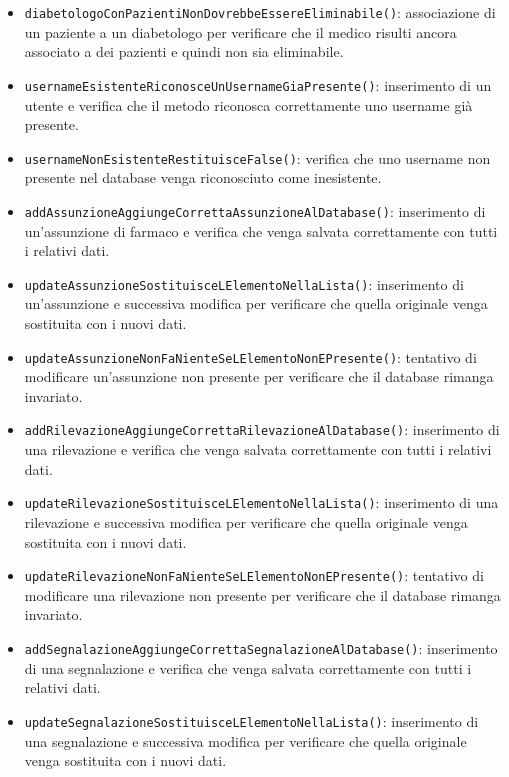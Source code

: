 \begin{itemize}
	\item \texttt{diabetologoConPazientiNonDovrebbeEssereEliminabile()}: associazione di un paziente a un diabetologo per verificare che il medico risulti ancora associato a dei pazienti e quindi non sia eliminabile.
	
	\item \texttt{usernameEsistenteRiconosceUnUsernameGiaPresente()}: inserimento di un utente e verifica che il metodo riconosca correttamente uno username già presente.
	
	\item \texttt{usernameNonEsistenteRestituisceFalse()}: verifica che uno username non presente nel database venga riconosciuto come inesistente.
	
	\item \texttt{addAssunzioneAggiungeCorrettaAssunzioneAlDatabase()}: inserimento di un'assunzione di farmaco e verifica che venga salvata correttamente con tutti i relativi dati.
	
	\item \texttt{updateAssunzioneSostituisceLElementoNellaLista()}: inserimento di un'assunzione e successiva modifica per verificare che quella originale venga sostituita con i nuovi dati.
	
	\item \texttt{updateAssunzioneNonFaNienteSeLElementoNonEPresente()}: tentativo di modificare un'assunzione non presente per verificare che il database rimanga invariato.
	
	\item \texttt{addRilevazioneAggiungeCorrettaRilevazioneAlDatabase()}: inserimento di una rilevazione e verifica che venga salvata correttamente con tutti i relativi dati.
	
	\item \texttt{updateRilevazioneSostituisceLElementoNellaLista()}: inserimento di una rilevazione e successiva modifica per verificare che quella originale venga sostituita con i nuovi dati.
	
	\item \texttt{updateRilevazioneNonFaNienteSeLElementoNonEPresente()}: tentativo di modificare una rilevazione non presente per verificare che il database rimanga invariato.
	
	\item \texttt{addSegnalazioneAggiungeCorrettaSegnalazioneAlDatabase()}: inserimento di una segnalazione e verifica che venga salvata correttamente con tutti i relativi dati.
	
	\item \texttt{updateSegnalazioneSostituisceLElementoNellaLista()}: inserimento di una segnalazione e successiva modifica per verificare che quella originale venga sostituita con i nuovi dati.
	

\end{itemize}
